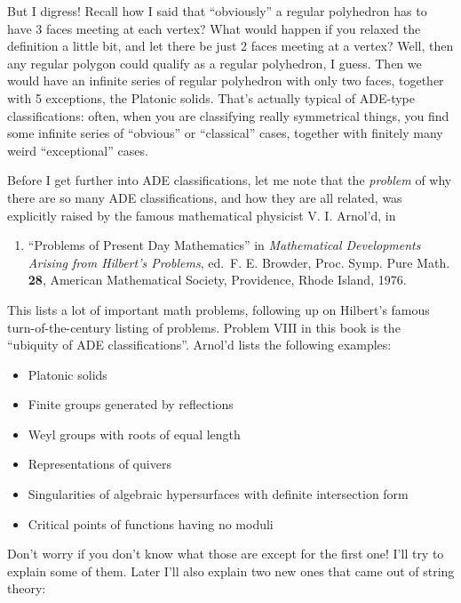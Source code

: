 \documentclass{article}
\def\tightlist{}
\begin{document}
But I digress! Recall how I said that ``obviously'' a regular polyhedron
has to have 3 faces meeting at each vertex? What would happen if you
relaxed the definition a little bit, and let there be just 2 faces
meeting at a vertex? Well, then any regular polygon could qualify as a
regular polyhedron, I guess. Then we would have an infinite series of
regular polyhedron with only two faces, together with 5 exceptions, the
Platonic solids. That's actually typical of ADE-type classifications:
often, when you are classifying really symmetrical things, you find some
infinite series of ``obvious'' or ``classical'' cases, together with
finitely many weird ``exceptional'' cases.

Before I get further into ADE classifications, let me note that the
\emph{problem} of why there are so many ADE classifications, and how
they are all related, was explicitly raised by the famous mathematical
physicist V. I. Arnol'd, in

\begin{enumerate}
\def\labelenumi{\arabic{enumi})}
\setcounter{enumi}{1}
\tightlist
\item
  ``Problems of Present Day Mathematics'' in \emph{Mathematical
  Developments Arising from Hilbert's Problems}, ed.~F. E. Browder,
  Proc. Symp. Pure Math. \textbf{28}, American Mathematical Society,
  Providence, Rhode Island, 1976.
\end{enumerate}

This lists a lot of important math problems, following up on Hilbert's
famous turn-of-the-century listing of problems. Problem VIII in this
book is the ``ubiquity of ADE classifications''. Arnol'd lists the
following examples:

\begin{itemize}
\tightlist
\item
  Platonic solids
\item
  Finite groups generated by reflections
\item
  Weyl groups with roots of equal length
\item
  Representations of quivers
\item
  Singularities of algebraic hypersurfaces with definite intersection
  form
\item
  Critical points of functions having no moduli
\end{itemize}

Don't worry if you don't know what those are except for the first one!
I'll try to explain some of them. Later I'll also explain two new ones
that came out of string theory:
\end{document}
